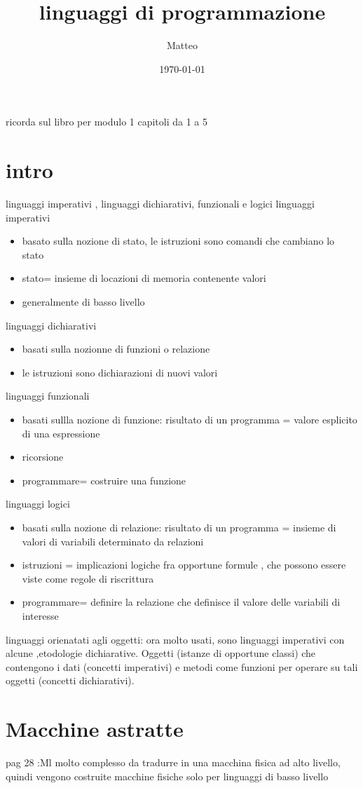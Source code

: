 \documentclass[12pt]{article}
\title{linguaggi di programmazione}
\author{Matteo}
\date{\today}
\begin{document}
\maketitle
ricorda sul libro per modulo 1 capitoli da 1 a 5
\section {intro}
linguaggi imperativi , linguaggi dichiarativi, funzionali e logici
linguaggi imperativi
\begin{itemize}
\item basato sulla nozione di stato, le istruzioni sono comandi che cambiano lo stato
\item stato= insieme di locazioni di memoria contenente valori
\item generalmente di basso livello
\end{itemize}
linguaggi dichiarativi
\begin{itemize}
\item basati sulla nozionne di funzioni o relazione
\item le istruzioni sono dichiarazioni di nuovi valori
\end{itemize}
linguaggi funzionali
\begin{itemize}
    \item basati sullla nozione di funzione: risultato di un programma = valore esplicito di una espressione
    \item ricorsione
    \item programmare= costruire una funzione
\end{itemize}
linguaggi logici
\begin{itemize}
    \item basati sulla nozione di relazione: risultato di un programma = insieme di valori di variabili determinato da relazioni
    \item istruzioni = implicazioni logiche fra opportune formule , che possono essere viste come regole  di riscrittura
    \item programmare= definire la relazione che definisce il valore delle variabili di interesse
\end{itemize}
linguaggi orienatati agli oggetti: ora molto usati, sono linguaggi imperativi con alcune ,etodologie dichiarative.
Oggetti (istanze di opportune classi) che contengono i dati
(concetti imperativi) e metodi come funzioni per operare su
tali oggetti (concetti dichiarativi).


\section{Macchine astratte}
pag 28 :Ml molto complesso  da tradurre in una macchina fisica ad alto livello, quindi vengono costruite macchine fisiche solo per linguaggi di basso livello
\end{document}
